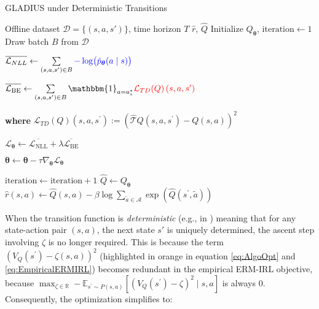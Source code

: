 \begin{algorithm}
\caption{GLADIUS under Deterministic Transitions}
\label{alg:estimation_deterministic}
\begin{algorithmic}[1]
\Require Offline dataset $\mathcal{D}=\{(s, a, s')\}$, time horizon $T$
\Ensure $\widehat{r}$, $\widehat{Q}$
\State Initialize $Q_{\boldsymbol{\theta}}$, $\text{iteration} \gets 1$
    \State Draw batch $B$ from $\mathcal{D}$
    
    \State $\overline{\mathcal{L}_{NLL}} \gets  \sum\limits_{(s, a, s^\prime)\in B}
    \textcolor{blue}{-\log\bigl(\hat{p}_{\boldsymbol{\theta}}(a \mid s)\bigr)}$
    
    \State $\overline{\mathcal{L}_{\mathrm{BE}}} \gets \sum\limits_{(s, a, s^\prime)\in B} 
    \mathbbm{1}_{a= a^*_s} \textcolor{red}{\mathcal{L}_{TD}(Q)\left(s, a, s^{\prime}\right)}$
    
    \State \textbf{where} $\mathcal{L}_{TD}(Q)\left(s, a, s^{\prime}\right) := \left(\hat{\mathcal{T}} Q\left(s, a, s^{\prime}\right)-Q(s, a)\right)^2$
    
    \State $\mathcal{L}_{\boldsymbol{\theta}} \gets \overline{\mathcal{L}_{\mathrm{NLL}}} 
    + \lambda \overline{\mathcal{L}_{\mathrm{BE}}}$
    
    \State $\boldsymbol{\theta} \gets \boldsymbol{\theta} - \tau \nabla_{\boldsymbol{\theta}} \mathcal{L}_{\boldsymbol{\theta}}$
    
    \State $\text{iteration} \gets \text{iteration} + 1$
\EndWhile
\State $\widehat{Q} \gets Q_{\boldsymbol{\theta}}$
\State $\widehat{r}(s, a) \gets \widehat{Q}(s, a) - \beta \log \sum_{\tilde{a} \in \mathcal{A}} \exp(\widehat{Q}(s^\prime, \tilde{a}))$
\end{algorithmic}
\end{algorithm}
When the transition function is \textit{deterministic} (e.g., in \citet{rafailov2024r, guo2025deepseek, zhong2024dpo}) meaning that for any state-action pair \((s, a)\), the next state \(s'\) is uniquely determined, the ascent step involving \(\zeta\) is no longer required. This is because the term \(\left(V_{Q}\left(s^{\prime}\right)-\zeta(s,a)\right)^2\) (highlighted in orange in equation \eqref{eq:AlgoOpt} and \eqref{eq:EmpiricalERMIRL}) becomes redundant in the empirical ERM-IRL objective, because $\max_{\zeta \in \mathbb{R}} -\mathbb{E}_{s^{\prime} \sim P(s, a)}\left[\left(V_Q\left(s^{\prime}\right)-\zeta\right)^2 \mid s, a\right]$ is always $0$. Consequently, the optimization simplifies to:

